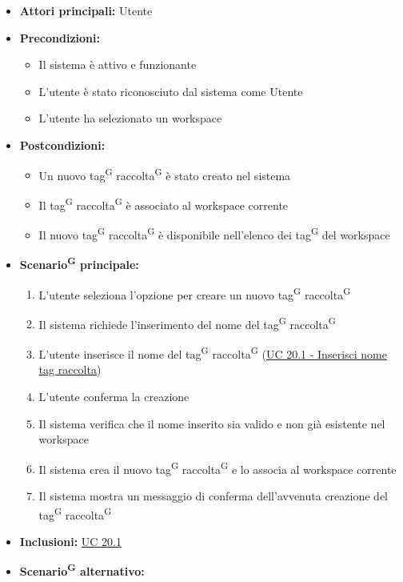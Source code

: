 \documentclass[a4paper, 11pt]{article}
\begin{document}
\begin{itemize}
	\item \textbf{Attori principali:} Utente
	\item \textbf{Precondizioni:} 
	\begin{itemize}
		\item Il sistema è attivo e funzionante
		\item L'utente è stato riconosciuto dal sistema come Utente
		\item L'utente ha selezionato un workspace
	\end{itemize}
	\item \textbf{Postcondizioni:} 
	\begin{itemize}
		\item Un nuovo tag\textsuperscript{G} raccolta\textsuperscript{G} è stato creato nel sistema
		\item Il tag\textsuperscript{G} raccolta\textsuperscript{G} è associato al workspace corrente
		\item Il nuovo tag\textsuperscript{G} raccolta\textsuperscript{G} è disponibile nell'elenco dei tag\textsuperscript{G} del workspace
	\end{itemize}
	\item \textbf{Scenario\textsuperscript{G} principale:}
	\begin{enumerate}
		\item L'utente seleziona l'opzione per creare un nuovo tag\textsuperscript{G} raccolta\textsuperscript{G}
		\item Il sistema richiede l'inserimento del nome del tag\textsuperscript{G} raccolta\textsuperscript{G}
		\item L'utente inserisce il nome del tag\textsuperscript{G} raccolta\textsuperscript{G} (\hyperref[UC20.1]{UC 20.1 - Inserisci nome tag raccolta})
		\item L'utente conferma la creazione
		\item Il sistema verifica che il nome inserito sia valido e non già esistente nel workspace
		\item Il sistema crea il nuovo tag\textsuperscript{G} raccolta\textsuperscript{G} e lo associa al workspace corrente
		\item Il sistema mostra un messaggio di conferma dell'avvenuta creazione del tag\textsuperscript{G} raccolta\textsuperscript{G}
	\end{enumerate}
	\item \textbf{Inclusioni:} \hyperref[UC20.1]{UC 20.1}
		\item \textbf{Scenario\textsuperscript{G} alternativo:}

\end{itemize}
\end{document}
